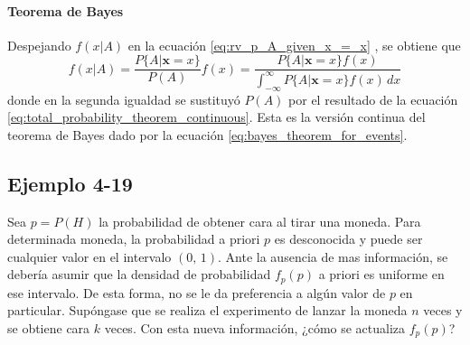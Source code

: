 \documentclass[a4paper]{report}
\newcommand{\x}{\mathbf{x}}
\begin{document}
\paragraph{Teorema de Bayes} Despejando \(f(x|A)\) en la ecuación \ref{eq:rv_p_A_given_x_=_x} , se obtiene que
\begin{equation}\label{eq:bayes_theorem_for_events_continuous}
 f(x|A)=\frac{P\{A|\x = x\}}{P(A)}f(x)=\frac{P\{A|\x = x\}f(x)}{\int_{-\infty}^{\infty}P\{A|\x = x\}f(x)\,dx}
\end{equation}
donde en la segunda igualdad se sustituyó \(P(A)\) por el resultado de la ecuación \ref{eq:total_probability_theorem_continuous}. Esta es la versión continua del teorema de Bayes dado por la ecuación \ref{eq:bayes_theorem_for_events}.

\subsection{Ejemplo 4-19}

Sea \(p=P(H)\) la probabilidad de obtener cara al tirar una moneda. Para determinada moneda, la probabilidad a priori \(p\) es desconocida y puede ser cualquier valor en el intervalo \((0,\,1)\). Ante la ausencia de mas información, se debería asumir que la densidad de probabilidad \(f_p(p)\) a priori es uniforme en ese intervalo. De esta forma, no se le da preferencia a algún valor de \(p\) en particular. Supóngase que se realiza el experimento de lanzar la moneda \(n\) veces y se obtiene cara \(k\) veces. Con esta nueva información, ¿cómo se actualiza \(f_p(p)\)?
\end{document}
